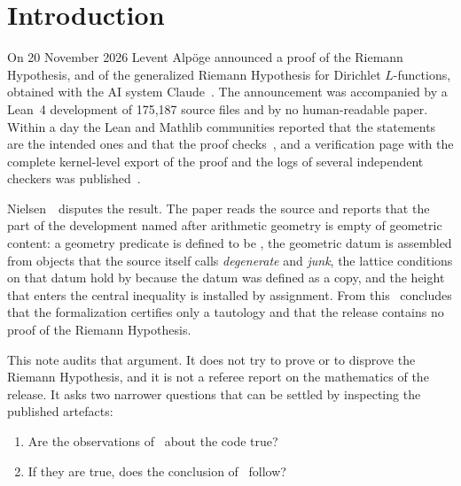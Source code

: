\section{Introduction}
\label{sec:intro}

On 20 November 2026 Levent Alpöge announced a proof of the Riemann Hypothesis, and of the generalized Riemann Hypothesis for Dirichlet $L$-functions, obtained with the AI system Claude~\cite{alpoge}.
The announcement was accompanied by a Lean~4 development of 175,187 source files and by no human-readable paper.
Within a day the Lean and Mathlib communities reported that the statements are the intended ones and that the proof checks~\cite{community}, and a verification page with the complete kernel-level export of the proof and the logs of several independent checkers was published~\cite{mit}.

Nielsen~\N\ disputes the result. The paper reads the source and reports that the part of the development named after arithmetic geometry is empty of geometric content:
a geometry predicate is defined to be , the geometric datum is assembled from objects that the source itself calls \emph{degenerate} and \emph{junk},
the lattice conditions on that datum hold by  because the datum was defined as a copy, and the height that enters the central inequality is installed by assignment.
From this \N\ concludes that the formalization certifies only a tautology and that the release contains no proof of the Riemann Hypothesis.

This note audits that argument. It does not try to prove or to disprove the Riemann Hypothesis, and it is not a referee report on the mathematics of the release.
It asks two narrower questions that can be settled by inspecting the published artefacts:

\begin{enumerate}[label=\textbf{Q\arabic*.},leftmargin=3em]
\item Are the observations of \N\ about the code true?
\item If they are true, does the conclusion of \N\ follow?
\end{enumerate}

